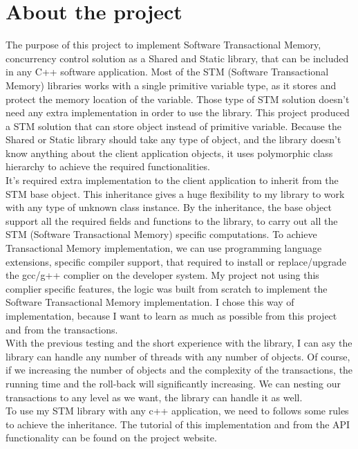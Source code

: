 \documentclass[12pt]{article}
\begin{document}
  
\section{About the project}
The purpose of this project to implement Software Transactional Memory, concurrency control solution as a Shared and Static library, that can be included in any C++ software application. Most of the STM (Software Transactional Memory) libraries works with a single primitive variable type, as it stores and protect the memory location of the variable. Those type of STM solution doesn't need any extra implementation in order to use the library. This project produced a STM solution that can store object instead of primitive variable. Because the Shared or Static library should take any type of object, and the library doesn't know anything about the client application objects, it uses polymorphic class hierarchy to achieve the required functionalities.\\

It's required extra implementation to the client application to inherit from the STM base object. This inheritance gives a huge flexibility to my library to work with any type of unknown class instance. By the inheritance, the base object support all the required fields and functions to the library, to carry out all the STM (Software Transactional Memory) specific computations. To achieve Transactional Memory implementation, we can use programming language extensions, specific compiler support, that required to install or replace/upgrade the gcc/g++ complier on the developer system. My project not using this complier specific features, the logic was built from scratch to implement the Software Transactional Memory implementation. I chose this way of implementation, because I want to learn as much as possible from this project and from the transactions.\\
 
With the previous testing and the short experience with the library, I can asy the library can handle any number of threads with any number of objects. Of course, if we increasing the number of objects and the complexity of the transactions, the running time and the roll-back will significantly increasing. We can nesting our transactions to any level as we want, the library can handle it as well.\\

To use my STM library with any c++ application, we need to follows some rules to achieve the inheritance. The tutorial of this implementation and from the API functionality can be found on the project website.
\end{document}
